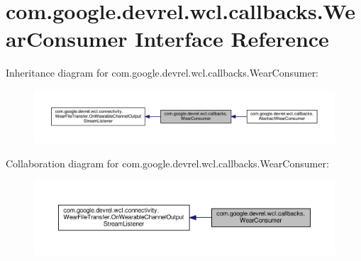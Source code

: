 \hypertarget{interfacecom_1_1google_1_1devrel_1_1wcl_1_1callbacks_1_1WearConsumer}{}\section{com.\+google.\+devrel.\+wcl.\+callbacks.\+Wear\+Consumer Interface Reference}
\label{interfacecom_1_1google_1_1devrel_1_1wcl_1_1callbacks_1_1WearConsumer}


Inheritance diagram for com.\+google.\+devrel.\+wcl.\+callbacks.\+Wear\+Consumer\+:\nopagebreak
\begin{figure}[H]
\begin{center}
\leavevmode
\includegraphics[width=350pt]{dc/d4b/interfacecom_1_1google_1_1devrel_1_1wcl_1_1callbacks_1_1WearConsumer__inherit__graph}
\end{center}
\end{figure}


Collaboration diagram for com.\+google.\+devrel.\+wcl.\+callbacks.\+Wear\+Consumer\+:\nopagebreak
\begin{figure}[H]
\begin{center}
\leavevmode
\includegraphics[width=350pt]{dd/df2/interfacecom_1_1google_1_1devrel_1_1wcl_1_1callbacks_1_1WearConsumer__coll__graph}
\end{center}
\end{figure}
